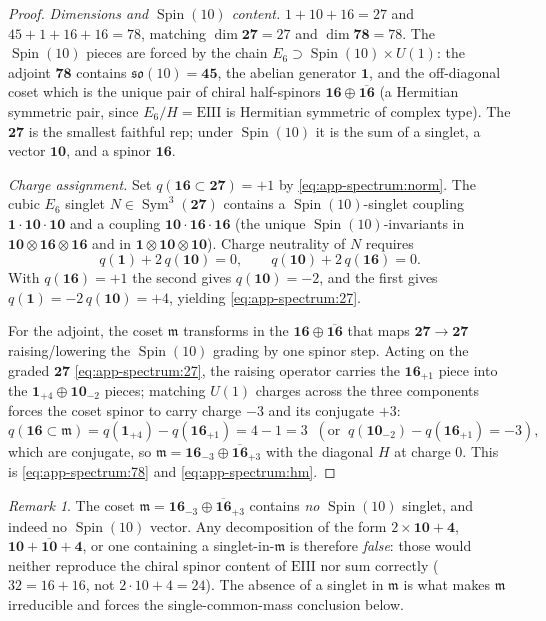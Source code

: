 \documentclass[11pt]{article}
\theoremstyle{plain}
\theoremstyle{definition}
\theoremstyle{remark}
\newtheorem{remark}[theorem]{Remark}
\newcommand{\Spin}{\operatorname{Spin}}
\newcommand{\Sym}{\operatorname{Sym}}
\begin{document}
\begin{proof}
\emph{Dimensions and $\Spin(10)$ content.}
$1+10+16=27$ and $45+1+16+16=78$, matching $\dim\mathbf{27}=27$ and
$\dim\mathbf{78}=78$. The $\Spin(10)$ pieces are forced by the chain
$E_6\supset\Spin(10)\times U(1)$: the adjoint $\mathbf{78}$ contains
$\mathfrak{so}(10)=\mathbf{45}$, the abelian generator $\mathbf{1}$, and
the off-diagonal coset which is the unique pair of chiral half-spinors
$\mathbf{16}\oplus\overline{\mathbf{16}}$ (a Hermitian symmetric pair,
since $E_6/H=\mathrm{EIII}$ is Hermitian symmetric of complex type). The
$\mathbf{27}$ is the smallest faithful rep; under $\Spin(10)$ it is the
sum of a singlet, a vector $\mathbf{10}$, and a spinor $\mathbf{16}$.

\emph{Charge assignment.} Set $q(\mathbf{16}\subset\mathbf{27})=+1$ by
\eqref{eq:app-spectrum:norm}. The cubic $E_6$ singlet
$N\in\Sym^3(\mathbf{27})$ contains a $\Spin(10)$-singlet coupling
$\mathbf{1}\cdot\mathbf{10}\cdot\mathbf{10}$ and a coupling
$\mathbf{10}\cdot\mathbf{16}\cdot\mathbf{16}$ (the unique
$\Spin(10)$-invariants in $\mathbf{10}\otimes\mathbf{16}\otimes\mathbf{16}$
and in $\mathbf{1}\otimes\mathbf{10}\otimes\mathbf{10}$). Charge
neutrality of $N$ requires
\[
  q(\mathbf 1)+2\,q(\mathbf{10})=0,
  \qquad
  q(\mathbf{10})+2\,q(\mathbf{16})=0 .
\]
With $q(\mathbf{16})=+1$ the second gives $q(\mathbf{10})=-2$, and the
first gives $q(\mathbf 1)=-2\,q(\mathbf{10})=+4$, yielding
\eqref{eq:app-spectrum:27}.

For the adjoint, the coset $\mathfrak m$ transforms in the
$\mathbf{16}\oplus\overline{\mathbf{16}}$ that maps
$\mathbf{27}\to\mathbf{27}$ raising/lowering the $\Spin(10)$ grading by
one spinor step. Acting on the graded $\mathbf{27}$
\eqref{eq:app-spectrum:27}, the raising operator carries the
$\mathbf{16}_{+1}$ piece into the $\mathbf{1}_{+4}\oplus\mathbf{10}_{-2}$
pieces; matching $U(1)$ charges across the three components forces the
coset spinor to carry charge $-3$ and its conjugate $+3$:
\[
  q(\mathbf{16}\subset\mathfrak m)
   = q(\mathbf{1}_{+4})-q(\mathbf{16}_{+1}) = 4-1 = 3
   \;\;(\text{or}\;\; q(\mathbf{10}_{-2})-q(\mathbf{16}_{+1})=-3),
\]
which are conjugate, so $\mathfrak m=\mathbf{16}_{-3}\oplus
\overline{\mathbf{16}}_{+3}$ with the diagonal $H$ at charge $0$. This is
\eqref{eq:app-spectrum:78} and \eqref{eq:app-spectrum:hm}.
\end{proof}

\begin{remark}\label{rem:app-spectrum:nosinglet}
The coset $\mathfrak m=\mathbf{16}_{-3}\oplus\overline{\mathbf{16}}_{+3}$
contains \emph{no} $\Spin(10)$ singlet, and indeed no $\Spin(10)$ vector.
Any decomposition of the form $2\times\mathbf{10}+\mathbf 4$,
$\mathbf{10}+\overline{\mathbf{10}}+\mathbf 4$, or one containing a
singlet-in-$\mathfrak m$ is therefore \emph{false}: those would neither
reproduce the chiral spinor content of $\mathrm{EIII}$ nor sum correctly
($32=16+16$, not $2\cdot10+4=24$). The absence of a singlet in
$\mathfrak m$ is what makes $\mathfrak m$ irreducible and forces the
single-common-mass conclusion below.
\end{remark}
\end{document}
